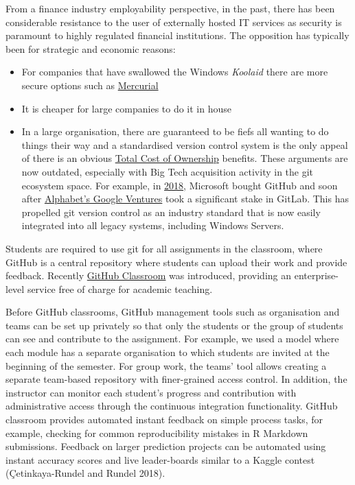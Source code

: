 \documentclass{article}
\begin{document}
From a finance industry employability perspective, in the past, there
has been considerable resistance to the user of externally hosted IT
services as security is paramount to highly regulated financial
institutions. The opposition has typically been for strategic and
economic reasons:

\begin{itemize}
\tightlist
\item
  For companies that have swallowed the Windows \emph{Koolaid} there are
  more secure options such as
  \href{https://www.mercurial-scm.org/}{Mercurial}
\item
  It is cheaper for large companies to do it in house
\item
  In a large organisation, there are guaranteed to be fiefs all wanting
  to do things their way and a standardised version control system is
  the only appeal of there is an obvious
  \href{https://www.investopedia.com/terms/t/totalcostofownership.asp}{Total
  Cost of Ownership} benefits. These arguments are now outdated,
  especially with Big Tech acquisition activity in the git ecosystem
  space. For example, in
  \href{https://www.bloomberg.com/news/articles/2018-06-03/microsoft-is-said-to-have-agreed-to-acquire-coding-site-github}{2018},
  Microsoft bought GitHub and soon after
  \href{https://www.bloomberg.com/news/articles/2018-09-19/alphabet-backs-gitlab-s-quest-to-surpass-microsoft-s-github}{Alphabet's
  Google Ventures} took a significant stake in GitLab. This has
  propelled git version control as an industry standard that is now
  easily integrated into all legacy systems, including Windows Servers.
\end{itemize}

Students are required to use git for all assignments in the classroom,
where GitHub is a central repository where students can upload their
work and provide feedback. Recently
\href{https://classroom.github.com/}{GitHub Classroom} was introduced,
providing an enterprise-level service free of charge for academic
teaching.

Before GitHub classrooms, GitHub management tools such as organisation
and teams can be set up privately so that only the students or the group
of students can see and contribute to the assignment. For example, we
used a model where each module has a separate organisation to which
students are invited at the beginning of the semester. For group work,
the teams' tool allows creating a separate team-based repository with
finer-grained access control. In addition, the instructor can monitor
each student's progress and contribution with administrative access
through the continuous integration functionality. GitHub classroom
provides automated instant feedback on simple process tasks, for
example, checking for common reproducibility mistakes in R Markdown
submissions. Feedback on larger prediction projects can be automated
using instant accuracy scores and live leader-boards similar to a Kaggle
contest (Çetinkaya-Rundel and Rundel 2018).
\end{document}
